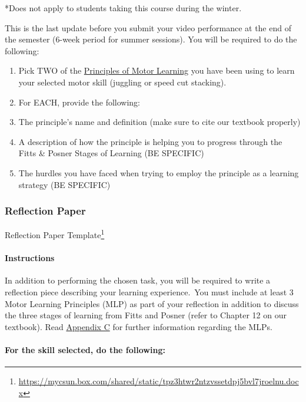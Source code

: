 \documentclass[
  letterpaper,
  DIV=11,
  numbers=noendperiod]{scrartcl}
\let\oldparagraph\paragraph
\renewcommand{\paragraph}[1]{\oldparagraph{#1}\mbox{}}
\DeclareRobustCommand{\href}[2]{#2\footnote{\url{#1}}}
\begin{document}
*Does not apply to students taking this course during the winter.

This is the last update before you submit your video performance at the
end of the semester (6-week period for summer sessions). You will be
required to do the following:

\begin{enumerate}
\def\labelenumi{\arabic{enumi}.}
\item
  Pick TWO of the \protect\hyperlink{sec-appendix-c}{Principles of Motor
  Learning} you have been using to learn your selected motor skill
  (juggling or speed cut stacking).
\item
  For EACH, provide the following:
\item
  The principle's name and definition (make sure to cite our textbook
  properly)
\item
  A description of how the principle is helping you to progress through
  the Fitts \& Posner Stages of Learning (BE SPECIFIC)
\item
  The hurdles you have faced when trying to employ the principle as a
  learning strategy (BE SPECIFIC)
\end{enumerate}

\hypertarget{sec-reflection-paper}{%
\subsubsection{Reflection Paper}\label{sec-reflection-paper}}

\href{https://mycsun.box.com/shared/static/tpz3htwr2ntzvssetdpj5bvl7jroelnu.docx}{Reflection
Paper Template}

\hypertarget{instructions}{%
\paragraph{Instructions}\label{instructions}}

In addition to performing the chosen task, you will be required to write
a reflection piece describing your learning experience.~You must include
at least 3 Motor Learning Principles (MLP) as part of your reflection in
addition to discuss the three stages of learning from Fitts and Posner
(refer to Chapter 12 on our textbook). Read
\protect\hyperlink{sec-appendix-c}{Appendix C} for further information
regarding the MLPs.

\hypertarget{for-the-skill-selected-do-the-following}{%
\paragraph{For the skill selected, do the
following:}\label{for-the-skill-selected-do-the-following}}
\end{document}
